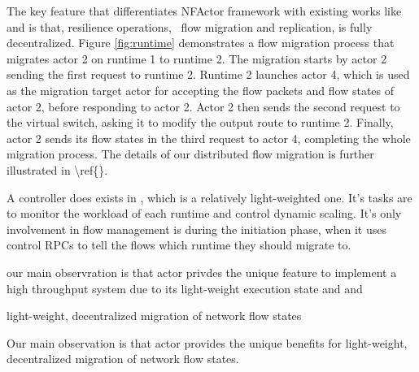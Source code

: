 The key feature that differentiates NFActor framework with existing works like \cite{gember2015opennf} and \cite{rajagopalan2013split} is that, resilience operations, \ie~flow migration and replication, is fully decentralized. Figure \ref{fig:runtime} demonstrates a flow migration process that migrates actor 2 on runtime 1 to runtime 2. \ac{The migration starts by actor 2 sending the first request to runtime 2. Runtime 2 launches actor 4, which is used as the migration target actor for accepting the flow packets and flow states of actor 2, before responding to actor 2. Actor 2 then sends the second request to the virtual switch, asking it to modify the output route to runtime 2. Finally, actor 2 sends its flow states in the third request to actor 4, completing the whole migration process. The details of our distributed flow migration is further illustrated in \ref{}.} 

A controller does exists in \nfactor, which is a relatively light-weighted one. It's tasks are to monitor the workload of each runtime and control dynamic scaling. It's only involvement in flow management is during the initiation phase, when it uses control RPCs to tell the flows which runtime they should migrate to.

our main observration is that actor privdes the unique feature to implement a high throughput system due to its light-weight execution state and and

light-weight, decentralized migration of network flow states

Our main observation is that actor provides the unique benefits for light-weight, decentralized migration of network flow states. 
